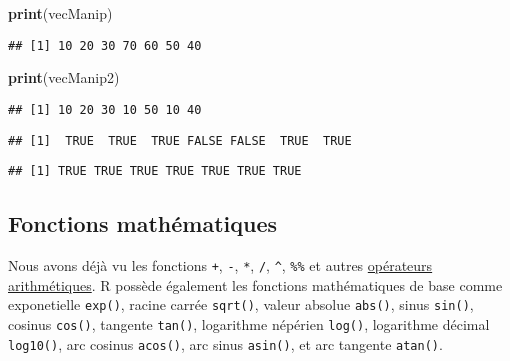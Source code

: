 \documentclass[]{book}
\newenvironment{Shaded}{\begin{snugshade}}{\end{snugshade}}
\newcommand{\KeywordTok}[1]{\textcolor[rgb]{0.13,0.29,0.53}{\textbf{#1}}}
\newcommand{\StringTok}[1]{\textcolor[rgb]{0.31,0.60,0.02}{#1}}
\newcommand{\OperatorTok}[1]{\textcolor[rgb]{0.81,0.36,0.00}{\textbf{#1}}}
\newcommand{\NormalTok}[1]{#1}
\theoremstyle{definition}
\theoremstyle{definition}
\theoremstyle{definition}
\theoremstyle{remark}
\begin{document}
\begin{Shaded}
\begin{Highlighting}[]
\KeywordTok{print}\NormalTok{(vecManip)}
\end{Highlighting}
\end{Shaded}

\begin{verbatim}
## [1] 10 20 30 70 60 50 40
\end{verbatim}

\begin{Shaded}
\begin{Highlighting}[]
\KeywordTok{print}\NormalTok{(vecManip2)}
\end{Highlighting}
\end{Shaded}

\begin{verbatim}
## [1] 10 20 30 10 50 10 40
\end{verbatim}

\begin{Shaded}
\end{Shaded}

\begin{verbatim}
## [1]  TRUE  TRUE  TRUE FALSE FALSE  TRUE  TRUE
\end{verbatim}

\begin{Shaded}
\end{Shaded}

\begin{verbatim}
## [1] TRUE TRUE TRUE TRUE TRUE TRUE TRUE
\end{verbatim}

\subsection{Fonctions mathématiques}\label{fonctions-mathematiques}

Nous avons déjà vu les fonctions \texttt{+}, \texttt{-}, \texttt{*},
\texttt{/}, \texttt{\^{}}, \texttt{\%\%} et autres
\protect\hyperlink{l011opari}{opérateurs arithmétiques}. R possède
également les fonctions mathématiques de base comme exponetielle
\texttt{exp()}, racine carrée \texttt{sqrt()}, valeur absolue
\texttt{abs()}, sinus \texttt{sin()}, cosinus \texttt{cos()}, tangente
\texttt{tan()}, logarithme népérien \texttt{log()}, logarithme décimal
\texttt{log10()}, arc cosinus \texttt{acos()}, arc sinus
\texttt{asin()}, et arc tangente \texttt{atan()}.
\end{document}
